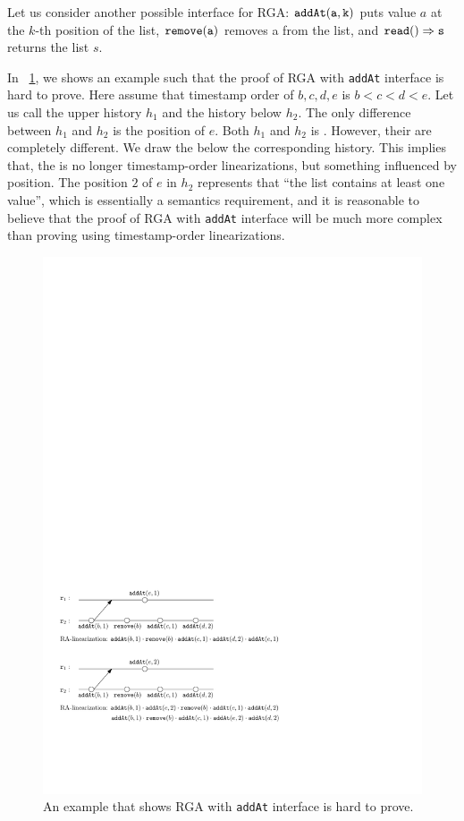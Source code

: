 Let us consider another possible interface for RGA: $\alabelshort[{\tt addAt}]{a,k}$ puts value $a$ at the $k$-th position of the list, $\alabelshort[{\tt remove}]{a}$ removes a from the list, and $\alabellong[{\tt read}]{}{s}{}$ returns the list $s$. 

In \figurename~\ref{fig:an example that shows RGA with addAt interface is hard to prove}, we shows an example such that the proof of RGA with {\tt addAt} interface is hard to prove. Here assume that timestamp order of $b,c,d,e$ is $b<c<d<e$. Let us call the upper history $h_1$ and the history below $h_2$. The only difference between $h_1$ and $h_2$ is the position of $e$. Both $h_1$ and $h_2$ is \crdtlinearizable{}. However, their \crdtlinearization{} are completely different. We draw the \crdtlinearization{} below the corresponding history. This implies that, the \crdtlinearization{} is no longer timestamp-order linearizations, but something influenced by position. The position $2$ of $e$ in $h_2$ represents that ``the list contains at least one value'', which is essentially a semantics requirement, and it is reasonable to believe that the proof of RGA with {\tt addAt} interface will be much more complex than proving using timestamp-order linearizations.

\begin{figure}[t]
  \centering
  \includegraphics[width=0.7 \textwidth]{figures/RGAwithaddAtisHardtoProve.pdf}
\vspace{-10pt}
  \caption{An example that shows RGA with {\tt addAt} interface is hard to prove.}
  \label{fig:an example that shows RGA with addAt interface is hard to prove}
\end{figure} 


